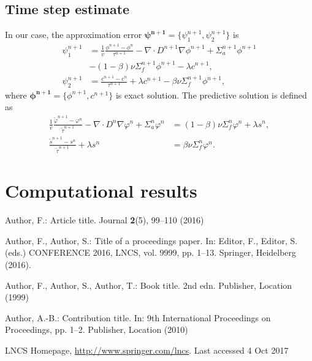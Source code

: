 \documentclass[runningheads]{llncs}
\begin{document}
\subsection{Time step estimate}
In our case, the approximation error $\bm{\psi^{n+1}} = \{\psi^{n+1}_1, \psi^{n+1}_2\}$ is
\begin{equation}\label{14}
\begin{split}
\psi^{n+1}_1  & =  \frac{1}{v} \frac{\phi^{n+1}-\phi^n}{\tau^{n+1}} - \nabla \cdot D^{n+1} \nabla \phi^{n+1} + \Sigma_{a}^{n+1} \phi^{n+1} \\
 & - (1-\beta) \nu \Sigma^{n+1}_{f} \phi^{n+1} - \lambda  c^{n+1}, \\
\psi^{n+1}_2  & =  \frac{ c^{n+1}-c^n}{\tau^{n+1}} + \lambda c^{n+1} - \beta \nu\Sigma_{f}^{n+1} \phi^{n+1},
\end{split}
\end{equation} 
where $\bm{\phi^{n+1}} = \{ \phi^{n+1}, c^{n+1} \}$ is exact solution.
The predictive solution is defined as
\begin{equation}\label{15}
\begin{split}
\frac{1}{v} \frac{\widetilde\varphi^{n+1}-\varphi^n}{\widetilde\tau^{n+1}} - \nabla \cdot D^n \nabla \varphi^n + \Sigma^n_{a} \varphi^n & = (1-\beta) \nu \Sigma^n_{f} \varphi^n + \lambda s^n, \\
\frac{\widetilde s^{n+1}-s^n}{\widetilde\tau^{n+1}} + \lambda s^n &= \beta \nu\Sigma^n_{f} \varphi^n.
\end{split}
\end{equation} 


\section{Computational results}
				


%
%
% 
% 
%
\begin{thebibliography}{8}
Author, F.: Article title. Journal \textbf{2}(5), 99--110 (2016)

Author, F., Author, S.: Title of a proceedings paper. In: Editor,
F., Editor, S. (eds.) CONFERENCE 2016, LNCS, vol. 9999, pp. 1--13.
Springer, Heidelberg (2016). 

Author, F., Author, S., Author, T.: Book title. 2nd edn. Publisher,
Location (1999)

Author, A.-B.: Contribution title. In: 9th International Proceedings
on Proceedings, pp. 1--2. Publisher, Location (2010)

LNCS Homepage, \url{http://www.springer.com/lncs}. Last accessed 4
Oct 2017
\end{thebibliography}
\end{document}
